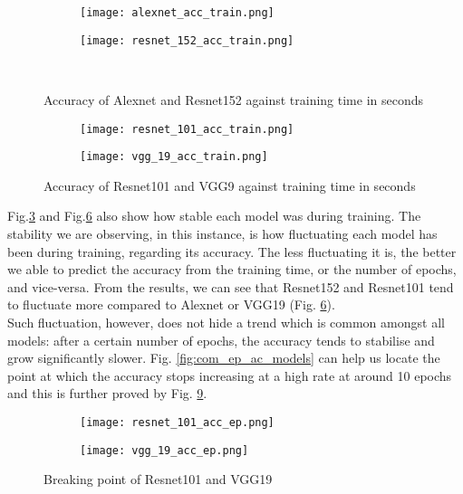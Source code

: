 \begin{figure}[h]
     \begin{subfigure}{0.5\textwidth}
	    \texttt{[image: alexnet\_acc\_train.png]}
         \label{fig:alexnet_acc_train}
     \end{subfigure}
     \hfill
     \begin{subfigure}{0.5\textwidth}
	    \texttt{[image: resnet\_152\_acc\_train.png]}
        \label{fig:resnet_152_acc_train}
     \end{subfigure}\\
     \caption{Accuracy of Alexnet and Resnet152 against training time in seconds}
        \label{fig:sing_acc_train2}
\end{figure}
\begin{figure}[h]
     \begin{subfigure}{0.5\textwidth}
	    \texttt{[image: resnet\_101\_acc\_train.png]}
        \label{fig:resnet_1o1_acc_train}
     \end{subfigure}
     \begin{subfigure}{0.5\textwidth}
	    \texttt{[image: vgg\_19\_acc\_train.png]}
        \label{fig:vgg_19_acc_train}
     \end{subfigure}
        \caption{Accuracy of Resnet101 and VGG9 against training time in seconds}
        \label{fig:sing_acc_train}
\end{figure}
Fig.\ref{fig:sing_acc_train2} and Fig.\ref{fig:sing_acc_train} also show how stable each model was during training. The stability we are observing, in this instance, is how fluctuating each model has been during training, regarding its accuracy. The less fluctuating it is, the better we able to predict the accuracy from the training time, or the number of epochs, and vice-versa. From the results, we can see that Resnet152 and Resnet101 tend to fluctuate more compared to Alexnet or VGG19 (Fig. \ref{fig:sing_acc_train}). \\
Such fluctuation, however, does not hide a trend which is common amongst all models: after a certain number of epochs, the accuracy tends to stabilise and grow significantly slower. Fig. \ref{fig:com_ep_ac_models} can help us locate the point at which the accuracy stops increasing at a high rate at around 10 epochs and this is further proved by Fig. \ref{fig:sing_acc_ep}.\\
\begin{figure}[h]
     \begin{subfigure}{0.5\textwidth}
	    \texttt{[image: resnet\_101\_acc\_ep.png]}
        \label{fig:resnet_101_acc_ep}
     \end{subfigure}
     \begin{subfigure}{0.5\textwidth}
	    \texttt{[image: vgg\_19\_acc\_ep.png]}
        \label{fig:vgg_19_acc_ep}
     \end{subfigure}
        \caption{Breaking point of Resnet101 and VGG19}
        \label{fig:sing_acc_ep}
\end{figure}\\

